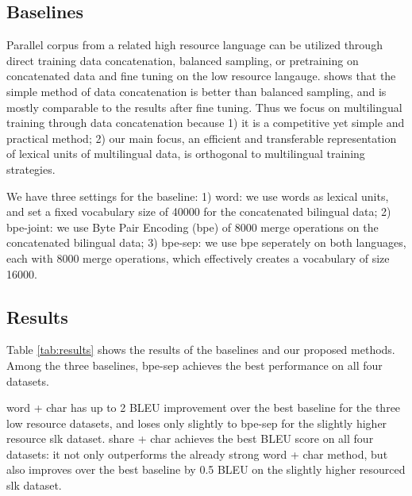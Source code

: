 \subsection{Baselines}
Parallel corpus from a related high resource language can be utilized through direct training data concatenation, balanced sampling, or pretraining on concatenated data and fine tuning on the low resource langauge. \cite{rapid_adapt} shows that the simple method of data concatenation is better than balanced sampling, and is mostly comparable to the results after fine tuning. Thus we focus on multilingual training through data concatenation because 1) it is a competitive yet simple and practical method; 2) our main focus, an efficient and transferable representation of lexical units of multilingual data, is orthogonal to multilingual training strategies.

We have three settings for the baseline: 1) word: we use words as lexical units, and set a fixed vocabulary size of 40000 for the concatenated bilingual data; 2) bpe-joint: we use Byte Pair Encoding (bpe) of 8000 merge operations on the concatenated bilingual data; 3) bpe-sep: we use bpe seperately on both languages, each with 8000 merge operations, which effectively creates a vocabulary of size 16000.

\subsection{Results}

Table \ref{tab:results} shows the results of the baselines and our proposed methods. Among the three baselines, bpe-sep achieves the best performance on all four datasets.   

word + char has up to 2 BLEU improvement over the best baseline for the three low resource datasets, and loses only slightly to bpe-sep for the slightly higher resource slk dataset. share + char achieves the best BLEU score on all four datasets: it not only outperforms the already strong word + char method, but also improves over the best baseline by 0.5 BLEU on the slightly higher resourced slk dataset.

